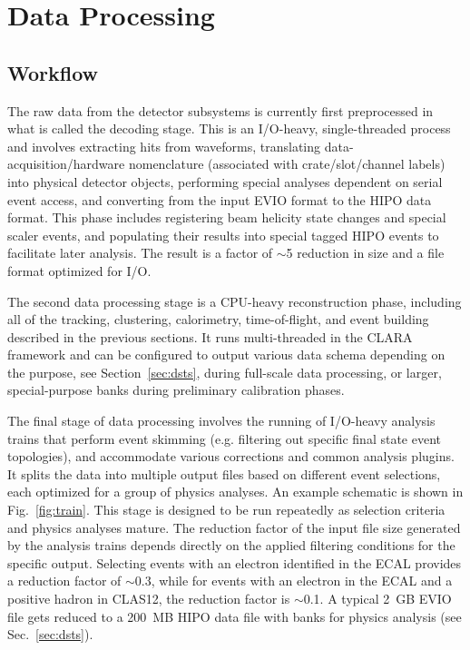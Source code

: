 \section{Data Processing}
\label{sec:dataproc}

\subsection{Workflow}

The raw data from the detector subsystems is currently first preprocessed in what is called the decoding
stage. This is an I/O-heavy, single-threaded process and involves extracting hits from waveforms, translating
data-acquisition/hardware nomenclature (associated with crate/slot/channel labels) into physical detector objects,
performing special analyses dependent on serial event access, and converting from the input EVIO format to the
HIPO data format.  This phase includes registering beam helicity state changes and special scaler events, and
populating their results into special tagged HIPO events to facilitate later analysis.  The result is a factor of
$\sim$5 reduction in size and a file format optimized for I/O.

The second data processing stage is a CPU-heavy reconstruction phase, including all of the tracking, clustering,
calorimetry, time-of-flight, and event building described in the previous sections.  It runs multi-threaded in the
CLARA framework and can be configured to output various data schema depending on the purpose, see
Section~\ref{sec:dsts}, during full-scale data processing, or larger, special-purpose banks during preliminary
calibration phases.

The final stage of data processing involves the running of I/O-heavy analysis trains that perform event skimming
(e.g. filtering out specific final state event topologies),  and accommodate various corrections and common analysis
plugins.  It splits the data into multiple output files based on different event selections, each optimized for a
group of physics analyses. An example schematic is shown in Fig.~\ref{fig:train}. This stage is designed to be run
repeatedly as selection criteria and physics analyses mature. The reduction factor of the input file size generated
by the analysis trains depends directly on the applied filtering conditions for the specific output. Selecting events
with an electron identified in the ECAL provides a reduction factor of $\sim$0.3, while for events with an electron
in the ECAL and a positive hadron in CLAS12, the reduction factor is $\sim$0.1.  A typical 2~GB EVIO file gets
reduced to a 200~MB {\color{red} HIPO data file with banks for physics analysis (see Sec.~\ref{sec:dsts}).}

